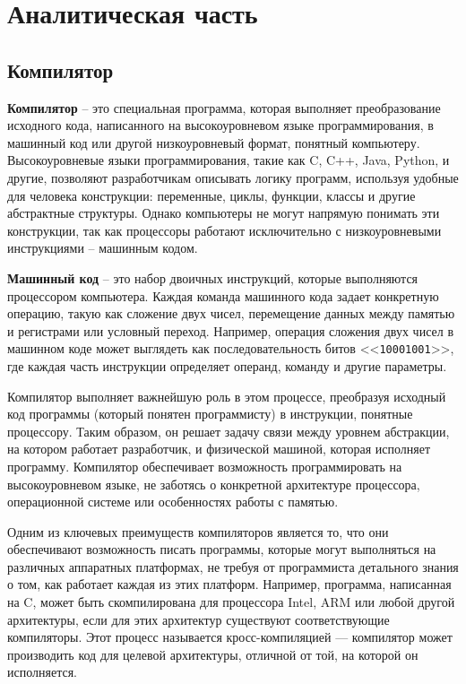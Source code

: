 \chapter{Аналитическая часть}

\section{Компилятор}

\textbf{Компилятор} \cite{compiler} -- это специальная программа, которая выполняет преобразование исходного кода, написанного на высокоуровневом языке программирования, в машинный код или другой низкоуровневый формат, понятный компьютеру. Высокоуровневые языки программирования, такие как C, C++, Java, Python, и другие, позволяют разработчикам описывать логику программ, используя удобные для человека конструкции: переменные, циклы, функции, классы и другие абстрактные структуры. Однако компьютеры не могут напрямую понимать эти конструкции, так как процессоры работают исключительно с низкоуровневыми инструкциями -- машинным кодом.

\textbf{Машинный код} \cite{machine-code} -- это набор двоичных инструкций, которые выполняются процессором компьютера. Каждая команда машинного кода задает конкретную операцию, такую как сложение двух чисел, перемещение данных между памятью и регистрами или условный переход. Например, операция сложения двух чисел в машинном коде может выглядеть как последовательность битов <<\texttt{10001001}>>, где каждая часть инструкции определяет операнд, команду и другие параметры.

Компилятор выполняет важнейшую роль в этом процессе, преобразуя исходный код программы (который понятен программисту) в инструкции, понятные процессору. Таким образом, он решает задачу связи между уровнем абстракции, на котором работает разработчик, и физической машиной, которая исполняет программу. Компилятор обеспечивает возможность программировать на высокоуровневом языке, не заботясь о конкретной архитектуре процессора, операционной системе или особенностях работы с памятью.

Одним из ключевых преимуществ компиляторов является то, что они обеспечивают возможность писать программы, которые могут выполняться на различных аппаратных платформах, не требуя от программиста детального знания о том, как работает каждая из этих платформ. Например, программа, написанная на C, может быть скомпилирована для процессора Intel, ARM или любой другой архитектуры, если для этих архитектур существуют соответствующие компиляторы. Этот процесс называется кросс-компиляцией — компилятор может производить код для целевой архитектуры, отличной от той, на которой он исполняется.


